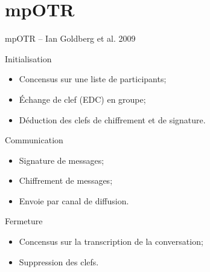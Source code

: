 \documentclass{beamer}
\begin{document}


\section{mpOTR}
\begin{frame}{mpOTR – Ian Goldberg et al. 2009~\cite{mpotr}}
	\begin{block}{Initialisation}
		\begin{itemize}
			\item Concensus sur une liste de participants;
      \item Échange de clef (EDC) en groupe;
			\item Déduction des clefs de chiffrement et de signature.
		\end{itemize}
  \end{block}

	\begin{block}{Communication}
		\begin{itemize}
			\item Signature de messages;
			\item Chiffrement de messages;
      \item Envoie par canal de diffusion.
		\end{itemize}
  \end{block}

	\begin{block}{Fermeture}
		\begin{itemize}
			\item Concensus sur la transcription de la conversation;
			\item Suppression des clefs.
		\end{itemize}
  \end{block}
\end{frame}
\end{document}
